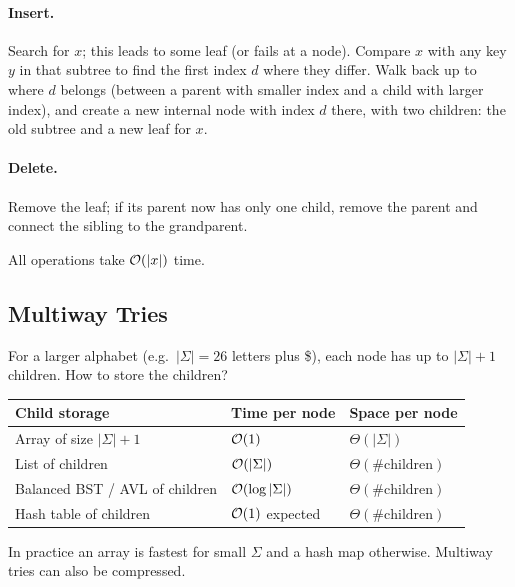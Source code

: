 \paragraph{Insert.} Search for $x$; this leads to some leaf (or fails at a node).
Compare $x$ with any key $y$ in that subtree to find the first index $d$ where
they differ. Walk back up to where $d$ belongs (between a parent with smaller
index and a child with larger index), and create a new internal node with index
$d$ there, with two children: the old subtree and a new leaf for $x$.

\paragraph{Delete.} Remove the leaf; if its parent now has only one child,
remove the parent and connect the sibling to the grandparent.

All operations take $\mathcal{O}(|x|)$ time.

\subsection{Multiway Tries}

For a larger alphabet (e.g.\ $|\Sigma| = 26$ letters plus \$), each node has up to
$|\Sigma| + 1$ children. How to store the children?
\begin{center}
\begin{tabular}{lll}
\toprule
Child storage & Time per node & Space per node\\
\midrule
Array of size $|\Sigma|+1$ & $\mathcal{O}(1)$ & $\Theta(|\Sigma|)$\\
List of children & $\mathcal{O}(|\Sigma|)$ & $\Theta(\#\text{children})$\\
Balanced BST / AVL of children & $\mathcal{O}(\log|\Sigma|)$ & $\Theta(\#\text{children})$\\
Hash table of children & $\mathcal{O}(1)$ expected & $\Theta(\#\text{children})$\\
\bottomrule
\end{tabular}
\end{center}
In practice an array is fastest for small $\Sigma$ and a hash map otherwise.
Multiway tries can also be compressed.

